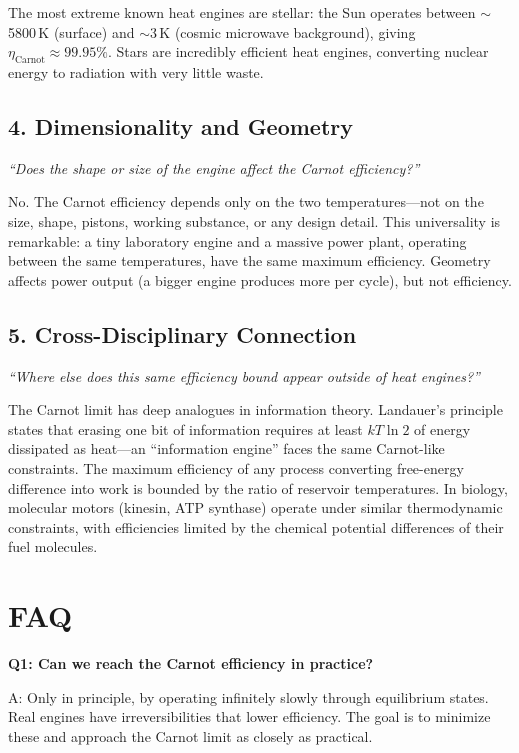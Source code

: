\documentclass[11pt,openright]{book}
\begin{document}
The most extreme known heat engines are stellar: the Sun operates between $\sim$5800\,K (surface) and $\sim$3\,K (cosmic microwave background), giving $\eta_{\text{Carnot}} \approx 99.95\%$. Stars are incredibly efficient heat engines, converting nuclear energy to radiation with very little waste.

\subsection*{4. Dimensionality and Geometry}
\textit{``Does the shape or size of the engine affect the Carnot efficiency?''}

No. The Carnot efficiency depends only on the two temperatures---not on the size, shape, pistons, working substance, or any design detail. This universality is remarkable: a tiny laboratory engine and a massive power plant, operating between the same temperatures, have the same maximum efficiency. Geometry affects power output (a bigger engine produces more per cycle), but not efficiency.

\subsection*{5. Cross-Disciplinary Connection}
\textit{``Where else does this same efficiency bound appear outside of heat engines?''}

The Carnot limit has deep analogues in information theory. Landauer's principle states that erasing one bit of information requires at least $kT \ln 2$ of energy dissipated as heat---an ``information engine'' faces the same Carnot-like constraints. The maximum efficiency of any process converting free-energy difference into work is bounded by the ratio of reservoir temperatures. In biology, molecular motors (kinesin, ATP synthase) operate under similar thermodynamic constraints, with efficiencies limited by the chemical potential differences of their fuel molecules.


\section*{FAQ}

\textbf{Q1: Can we reach the Carnot efficiency in practice?}

A: Only in principle, by operating infinitely slowly through equilibrium states. Real engines have irreversibilities that lower efficiency. The goal is to minimize these and approach the Carnot limit as closely as practical.
\end{document}
